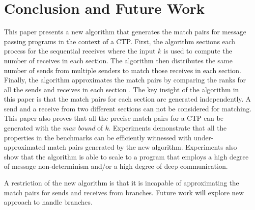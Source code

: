 \section{Conclusion and Future Work}
This paper presents a new algorithm that generates the match pairs for message passing programs in the context of a CTP.
First, the algorithm sections each process for the sequential receives where the input $k$ is used to compute the number of receives in each section.
The algorithm then distributes the same number of sends from multiple senders to match those receives in each section. Finally, the algorithm approximates the match pairs by comparing the ranks for all the sends and receives in each section \cite{DBLP:conf/kbse/HuangMM13}. The key insight of the algorithm in this paper is that the match pairs for each section are generated independently. 
A send and a receive from two different sections can not be considered for matching. 
This paper also proves that all the precise match pairs for a CTP can be generated with the \textit{max bound} of $k$. Experiments demonstrate that all the properties in the benchmarks can be efficiently witnessed with under-approximated match pairs generated by the new algorithm. Experiments also show that the algorithm is able to scale to a program that employs a high degree of message non-determinism and/or a high degree of deep communication.

A restriction of the new algorithm is that it is incapable of approximating the match pairs for sends and receives from branches. Future work will explore new approach to handle branches.


